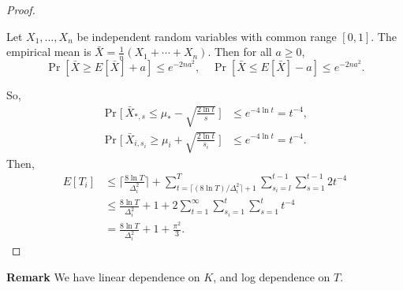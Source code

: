 \begin{proof}
    \begin{framed}
        \begin{fact}
            Let $X_1, \dots, X_n$ be independent random variables with common range $[0,1]$.
            The empirical mean is $\bar X=\frac{1}{n}(X_1+\cdots+ X_n)$.
            Then for all $a\ge0$,
            \begin{equation}
                \Pr[\bar X\ge E[\bar X] + a] \le e^{-2na^2}, \quad
                \Pr[\bar X\le E[\bar X] - a] \le e^{-2na^2}.
            \end{equation}
        \end{fact}
    \end{framed}
    So,
    \begin{align}
        \Pr\Bigg[~\bar X_{*,s} \le \mu_* - \sqrt{\frac{2\ln t}{s}}~\Bigg]
            &\le e^{-4\ln t} = t^{-4}, \\
        \Pr\Bigg[~\bar X_{i,s_i} \ge \mu_i + \sqrt{\frac{2\ln t}{s_i}}~\Bigg]
            &\le e^{-4\ln t} = t^{-4}.
    \end{align}
    Then,
    \begin{align}
        E[T_i]
            &\le \bigg\lceil \frac{8\ln T}{\Delta_i^2}\bigg\rceil +
            \sum_{t=\lceil (8\ln T)/\Delta_i^2\rceil+1}^T
            \sum_{s_i=l}^{t-1} \sum_{s=1}^{t-1}
            2t^{-4} \\
            &\le \frac{8\ln T}{\Delta_i^2} + 1 +
            2\sum_{t=1}^\infty \sum_{s_i=1}^{t} \sum_{s=1}^{t}t^{-4} \\
            &= \frac{8\ln T}{\Delta_i^2} + 1 + \frac{\pi^2}{3}.
    \end{align}
\end{proof}

\textbf{Remark}
We have linear dependence on $K$,
and log dependence on $T$.
